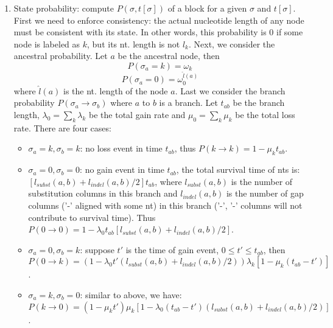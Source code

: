 \documentclass[11pt]{article}
\begin{document}
\begin{enumerate}
\begin{enumerate}
\item State probability: compute $P(\sigma,t[\sigma])$ of a block for a given $\sigma$ and $t[\sigma]$. First we need to enforce consistency: the actual nucleotide length of any node must be consistent with its state. In other words, this probability is 0 if some node is labeled as $k$, but its nt. length is not $l_k$. Next, we consider the ancestral probability. Let $a$ be the ancestral node, then 
\begin{equation}
P(\sigma_a = k) = \omega_k
\end{equation} 
\begin{equation}
P(\sigma_a = 0) = \omega_0^{\hat{l}(a)}
\end{equation}
where $\hat{l}(a)$ is the nt. length of the node $a$. Last we consider the branch probability $P(\sigma_a \rightarrow \sigma_b)$ where $a$ to $b$ is a branch. Let $t_{ab}$ be the branch length, $\lambda_0 = \sum_k{\lambda_k}$ be the total gain rate and $\mu_0 = \sum_k{\mu_k}$ be the total loss rate. There are four cases:
\begin{itemize}
\item $\sigma_a = k, \sigma_b = k$: no loss event in time $t_{ab}$, thus $P(k \rightarrow k) = 1 - \mu_k t_{ab}$.  

\item $\sigma_a = 0, \sigma_b = 0$: no gain event in time $t_{ab}$, the total survival time of nts is: $[l_{subst}(a,b) + l_{indel}(a,b)/2] t_{ab}$, where $l_{subst}(a,b)$ is the number of substitution columns in this branch and $l_{indel}(a,b)$ is the number of gap columns ('-' aligned with some nt) in this branch  ('-', '-' columns will not contribute to survival time). Thus $P(0 \rightarrow 0) = 1 - \lambda_0 t_{ab}[l_{ subst}(a,b) + l_{indel}(a,b)/2]$. 

\item $\sigma_a = 0, \sigma_b = k$: suppose $t'$ is the time of gain event, $0 \leq t' \leq t_{ab}$, then $P(0 \rightarrow k) = (1 - \lambda_0 t' (l_{ subst}(a,b) + l_{indel}(a,b)/2)) \lambda_k [1 - \mu_k(t_{ab} - t')]$. 

\item $\sigma_a = k, \sigma_b = 0$: similar to above, we have: $P(k \rightarrow 0) = (1 - \mu_k t') \mu_k [1 - \lambda_0(t_{ab} - t') (l_{ subst}(a,b) + l_{indel}(a,b)/2)]$.
\end{itemize}


\end{enumerate}
\end{enumerate}
\end{document}
